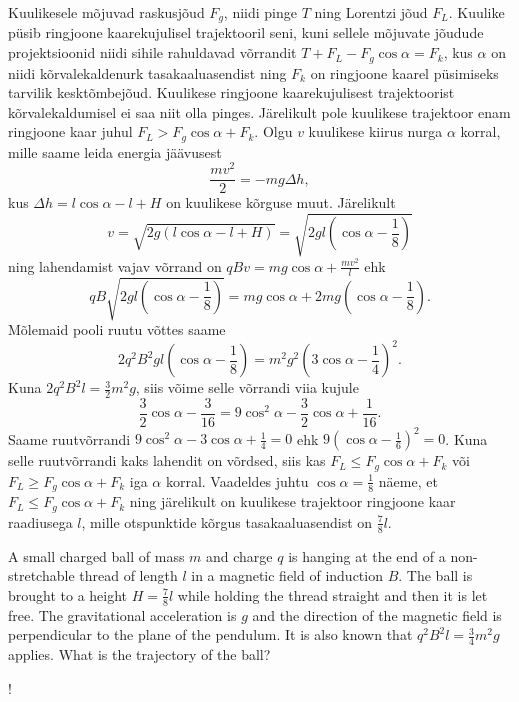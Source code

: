 {\ifSolution
Kuulikesele mõjuvad raskusjõud $F_g$, niidi pinge $T$ ning Lorentzi jõud $F_L$. Kuulike püsib ringjoone kaarekujulisel trajektooril seni, kuni sellele mõjuvate jõudude projektsioonid niidi sihile rahuldavad võrrandit $T+F_L-F_g\cos\alpha=F_k$, kus $\alpha$ on niidi kõrvalekaldenurk tasakaaluasendist ning $F_k$ on ringjoone kaarel püsimiseks tarvilik kesktõmbejõud. Kuulikese ringjoone kaarekujulisest trajektoorist kõrvalekaldumisel ei saa niit olla pinges. Järelikult pole kuulikese trajektoor enam ringjoone kaar juhul $F_L>F_g\cos\alpha+F_k$. Olgu $v$ kuulikese kiirus nurga $\alpha$ korral, mille saame leida energia jäävusest 
\[
\frac{mv^2}{2}=-mg\Delta h,
\]
kus $\Delta h=l\cos\alpha-l+H$ on kuulikese kõrguse muut. Järelikult 
\[
v=\sqrt{2g\left(l\cos\alpha-l+H\right)}=\sqrt{2gl\left(\cos\alpha-\frac{1}{8}\right)}
\]
ning lahendamist vajav võrrand on $qBv=mg\cos\alpha+\frac{mv^2}{l}$ ehk 
\[
qB\sqrt{2gl\left(\cos\alpha-\frac{1}{8}\right)}=mg\cos\alpha+2mg\left(\cos\alpha-\frac{1}{8}\right).
\]
Mõlemaid pooli ruutu võttes saame
\[
2q^2B^2gl\left(\cos\alpha-\frac{1}{8}\right)=m^2g^2\left(3\cos\alpha-\frac{1}{4}\right)^2.
\] 
Kuna $2q^2B^2l=\frac{3}{2}m^2g$, siis võime selle võrrandi viia kujule 
\[
\frac{3}{2}\cos\alpha-\frac{3}{16}=9\cos^2\alpha-\frac{3}{2}\cos\alpha+\frac{1}{16}.
\]
Saame ruutvõrrandi $9\cos^2\alpha-3\cos\alpha+\frac{1}{4}=0$ ehk $9\left(\cos\alpha-\frac{1}{6}\right)^2=0$. Kuna selle ruutvõrrandi kaks lahendit on võrdsed, siis kas $F_L\leq F_g\cos\alpha+F_k$ või $F_L\geq F_g\cos\alpha+F_k$ iga $\alpha$ korral. Vaadeldes juhtu $\cos\alpha=\frac{1}{8}$ näeme, et $F_L\leq F_g\cos\alpha+F_k$ ning järelikult on kuulikese trajektoor ringjoone kaar raadiusega $l$, mille otspunktide kõrgus tasakaaluasendist on $\frac{7}{8}l$.
\fi


\ifEngStatement
A small charged ball of mass $m$ and charge $q$ is hanging at the end of a non-stretchable thread of length $l$ in a magnetic field of induction $B$. The ball is brought to a height $H=\frac{7}{8}l$ while holding the thread straight and then it is let free. The gravitational acceleration is $g$ and the direction of the magnetic field is perpendicular to the plane of the pendulum. It is also known that $q^2B^2l=\frac{3}{4}m^2g$ applies. What is the trajectory of the ball?
\begin{center}
\begin{resizebox}{0.5\linewidth}{!}{
}
\end{resizebox}
\end{center}}
